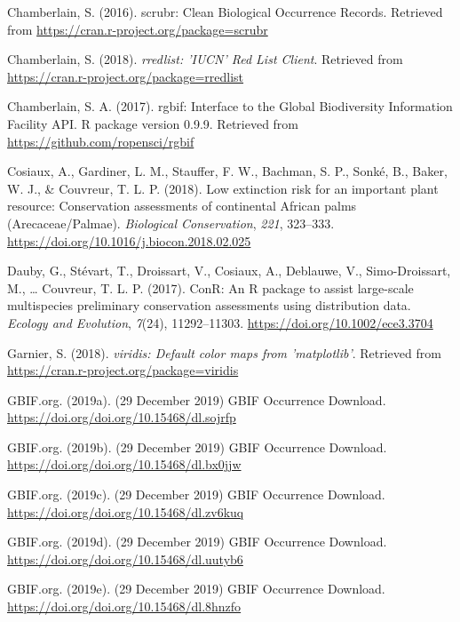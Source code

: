\documentclass[
  12pt,
]{article}
\begin{document}
\leavevmode\hypertarget{ref-Chamberlain2016}{}%
Chamberlain, S. (2016). scrubr: Clean Biological Occurrence Records. Retrieved from \url{https://cran.r-project.org/package=scrubr}

\leavevmode\hypertarget{ref-Chamberlain2018}{}%
Chamberlain, S. (2018). \emph{rredlist: 'IUCN' Red List Client}. Retrieved from \url{https://cran.r-project.org/package=rredlist}

\leavevmode\hypertarget{ref-Chamberlain2017}{}%
Chamberlain, S. A. (2017). rgbif: Interface to the Global Biodiversity Information Facility API. R package version 0.9.9. Retrieved from \url{https://github.com/ropensci/rgbif}

\leavevmode\hypertarget{ref-Cosiaux2018}{}%
Cosiaux, A., Gardiner, L. M., Stauffer, F. W., Bachman, S. P., Sonké, B., Baker, W. J., \& Couvreur, T. L. P. (2018). Low extinction risk for an important plant resource: Conservation assessments of continental African palms (Arecaceae/Palmae). \emph{Biological Conservation}, \emph{221}, 323--333. \url{https://doi.org/10.1016/j.biocon.2018.02.025}

\leavevmode\hypertarget{ref-Dauby2017}{}%
Dauby, G., Stévart, T., Droissart, V., Cosiaux, A., Deblauwe, V., Simo-Droissart, M., \ldots{} Couvreur, T. L. P. (2017). ConR: An R package to assist large-scale multispecies preliminary conservation assessments using distribution data. \emph{Ecology and Evolution}, \emph{7}(24), 11292--11303. \url{https://doi.org/10.1002/ece3.3704}

\leavevmode\hypertarget{ref-Garnier2018}{}%
Garnier, S. (2018). \emph{viridis: Default color maps from 'matplotlib'}. Retrieved from \url{https://cran.r-project.org/package=viridis}

\leavevmode\hypertarget{ref-GBIForg2019}{}%
GBIF.org. (2019a). (29 December 2019) GBIF Occurrence Download. \url{https://doi.org/doi.org/10.15468/dl.sojrfp}

\leavevmode\hypertarget{ref-GBIForg2019a}{}%
GBIF.org. (2019b). (29 December 2019) GBIF Occurrence Download. \url{https://doi.org/doi.org/10.15468/dl.bx0jjw}

\leavevmode\hypertarget{ref-GBIForg2019b}{}%
GBIF.org. (2019c). (29 December 2019) GBIF Occurrence Download. \url{https://doi.org/doi.org/10.15468/dl.zv6kuq}

\leavevmode\hypertarget{ref-GBIForg2019c}{}%
GBIF.org. (2019d). (29 December 2019) GBIF Occurrence Download. \url{https://doi.org/doi.org/10.15468/dl.uutyb6}

\leavevmode\hypertarget{ref-GBIForg2019d}{}%
GBIF.org. (2019e). (29 December 2019) GBIF Occurrence Download. \url{https://doi.org/doi.org/10.15468/dl.8hnzfo}
\end{document}
